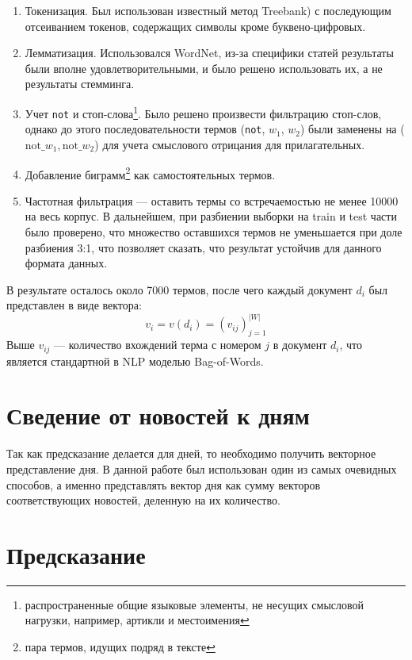 \documentclass[pdftex,ptm,12pt,a4paper]{report}
\begin{document}
\begin{enumerate}

\item Токенизация. Был использован известный метод Treebank\cite{treebank}) с последующим отсеиванием токенов,
содержащих символы кроме буквено-цифровых.
\item Лемматизация. Использовался WordNet\cite{wordnet}, из-за специфики статей результаты были вполне удовлетворительными,
и было решено использовать их, а не результаты стемминга.
\item Учет \texttt{not} и стоп-слова\footnote{распространенные общие языковые элементы, не несущих смысловой нагрузки,
например, артикли и местоимения}. Было решено произвести фильтрацию стоп-слов, однако до этого последовательности
термов (\texttt{not}, $w_1$, $w_2$) были заменены на ($\text{not\_} w_1, \text{not\_} w_2$) для учета смыслового отрицания
для прилагательных.
\item Добавление биграмм\footnote{пара термов, идущих подряд в тексте} как самостоятельных термов.
\item Частотная фильтрация --- оставить термы со встречаемостью не менее 10000 на весь корпус. В дальнейшем, при разбиении
выборки на train и test части было проверено, что множество оставшихся термов не уменьшается при доле
разбиения 3:1, что позволяет сказать, что результат устойчив для данного формата данных.

\end{enumerate}

В результате осталось около 7000 термов, после чего каждый документ $d_i$ был представлен в виде вектора:
\begin{equation}
v_i = v(d_i) = (v_{ij})_{j=1}^{|W|}
\end{equation}
Выше $v_{ij}$ --- количество вхождений терма с номером $j$ в документ $d_i$, что является стандартной в NLP
моделью Bag-of-Words.

\section{Сведение от новостей к дням}

Так как предсказание делается для дней, то необходимо получить векторное представление дня.
В данной работе был использован один из самых очевидных способов, а именно представлять вектор дня как сумму векторов соответствующих новостей, деленную на их количество.

\section{Предсказание}
\end{document}

